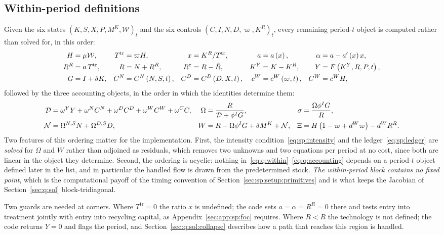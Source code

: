 \subsection{Within-period definitions}\label{sec:q:model:within}

Given the six states $\left(K,S,X,P,M^K,\mathcal W\right)_t$ and the six controls $\left(C,I,N,D,\varpi,K^R\right)_t$, every remaining period-$t$ object is computed rather than solved for, in this order:
\begin{align}
H &= \mu\mathcal W, &
T^{\mathrm{tr}} &= \varpi H, &
x &= K^R/T^{\mathrm{tr}}, &
a &= a\left(x\right), &
\alpha &= a-a'\left(x\right)x,
\notag\\
R^R &= a\,T^{\mathrm{tr}}, &
R &= N+R^R, &
R^{e} &= R-\bar R, &
K^Y &= K-K^R, &
Y &= F\left(K^Y,R,P,t\right),
\notag\\
G &= I+\delta K, &
C^N &= C^N\left(N,S,t\right), &
C^D &= C^D\left(D,X,t\right), &
c^W &= c^W\left(\varpi,t\right), &
C^W &= c^WH,
\label{eq:q:within}
\end{align}
followed by the three accounting objects, in the order in which the identities determine them:
\begin{align}
\mathcal D &= \omega^YY+\omega^NC^N+\omega^DC^D+\omega^WC^W+\omega^CC,
&
\Omega &= \frac{R}{\mathcal D+\phi^IG},
&
\sigma &= \frac{\Omega\phi^IG}{R},
\notag\\
\mathcal N &= \Omega^{N,S}N+\Omega^{D,S}D,
&
W &= R-\Omega\phi^IG+\delta M^K+\mathcal N,
&
\Xi &= H\left(1-\varpi+d^W\varpi\right)-d^WR^R .
\label{eq:q:accounting}
\end{align}
Two features of this ordering matter for the implementation. First, the intensity condition~\eqref{eq:sp:intensity} and the ledger~\eqref{eq:sp:ledger} are \emph{solved} for $\Omega$ and $W$ rather than adjoined as residuals, which removes two unknowns and two equations per period at no cost, since both are linear in the object they determine. Second, the ordering is acyclic: nothing in~\eqref{eq:q:within}--\eqref{eq:q:accounting} depends on a period-$t$ object defined later in the list, and in particular the handled flow is drawn from the predetermined stock. \emph{The within-period block contains no fixed point}, which is the computational payoff of the timing convention of Section~\ref{sec:sp:setup:primitives} and is what keeps the Jacobian of Section~\ref{sec:q:sol} block-tridiagonal.

Two guards are needed at corners. Where $T^{\mathrm{tr}}=0$ the ratio $x$ is undefined; the code sets $a=\alpha=R^R=0$ there and tests entry into treatment jointly with entry into recycling capital, as Appendix~\ref{sec:app:sp:foc} requires. Where $R<\bar R$ the technology is not defined; the code returns $Y=0$ and flags the period, and Section~\ref{sec:q:sol:collapse} describes how a path that reaches this region is handled.


